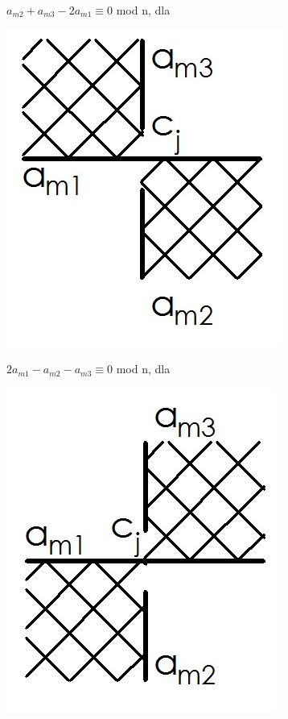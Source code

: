 	\begin{minipage}{0.5\textwidth}
$a_{m2}+a_{m3}-2a_{m1} \equiv 0$ mod n, dla \\	
	\begin{center}
			\includegraphics[scale=0.3]{2/Obrazy/Cros+}
	\end{center}
	\end{minipage}
	\begin{minipage}{0.5\textwidth}
$2a_{m1}-a_{m2}-a_{m3} \equiv 0$ mod n, dla \\
	\begin{center}
			\includegraphics[scale=0.3]{2/Obrazy/Cros-}
	\end{center}	
	\end{minipage}

